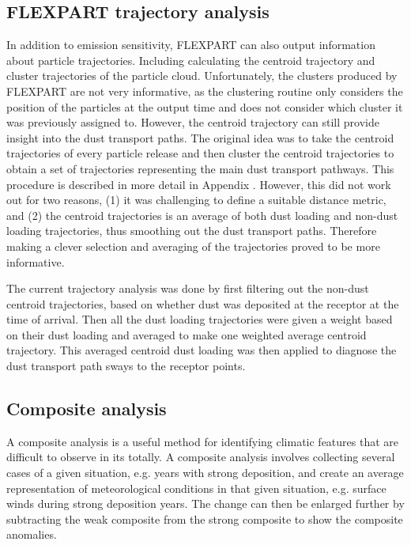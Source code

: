 \subsection{FLEXPART trajectory analysis}\label{chap:method_trajec_analysis}
In addition to emission sensitivity, FLEXPART can also output information about particle trajectories. Including calculating the centroid trajectory and cluster trajectories of the particle cloud. 
Unfortunately, the clusters produced by FLEXPART are not very informative, as the clustering routine only considers the position of the particles at the output time and does not consider which cluster it was previously assigned to. However, the centroid trajectory can still provide insight into the dust transport paths. 
The original idea was to take the centroid trajectories of every particle release and then cluster the centroid trajectories to obtain a set of trajectories representing the main dust transport pathways. 
This procedure is described in more detail in Appendix . However, this did not work out for two reasons, (1) it was challenging to define a suitable distance metric, and (2) the centroid trajectories is an average of both dust loading and non-dust loading trajectories, thus smoothing out the dust transport paths. 
Therefore making a clever selection and averaging of the trajectories proved to be more informative. 

The current trajectory analysis was done by first filtering out the  non-dust centroid trajectories, based on whether dust was deposited at the receptor at the time of arrival. Then all the dust loading trajectories were given a weight based on their dust loading and averaged to make one weighted average centroid trajectory. This averaged centroid dust loading was then applied to diagnose the dust transport path sways to the receptor points.       
 

\subsection{Composite analysis}

A composite analysis is a useful method for identifying climatic features that are difficult to observe in its totally. 
A composite analysis involves collecting several cases of a given situation, e.g. years with strong deposition, and create an average representation of meteorological conditions in that given situation, e.g. surface winds during strong deposition years. 
The change can then be enlarged further by subtracting the weak composite from the strong composite to show the composite anomalies. 
     
